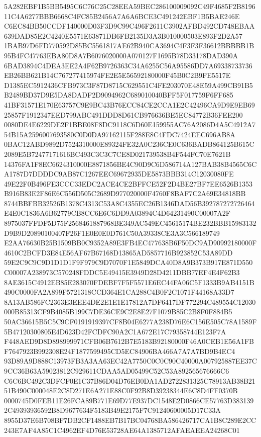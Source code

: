 \documentclass[UTF8,fontset=fandol,zihao=-4,a4paper]{ctexart}
\begin{document}
{{5A282EBF1B5BB5495C6C76C25C28EEA59BEC286100009092C49F4685F2B819611C4A6277BBB6668C4FC85B2456A7A6A6BCE3C491242EBF1B5BAE246E
C6EC84BB50CCDF140000D03F3D9C99C496F2611C3902AFBD492CD748EBAA639DAD85E2C4240E5571E63871DB6FB2135D3A3B010000503E893F2D2A57
1BAB97D6FD770592D85BC5561817AE62B940CA3694C4F3F3F36612BBBBB1B95B4FC47763EBA80D8A7B6076020000A070127F1695B78D33178DAD390A
6BAD3894C4DEA3EE2A4F62B9726363C34A6255C56A95586DD7A69338733736EB26BB621B14C767277415974FE2E5E56592180000F45B0C2B9FE5517E
D1385EC5912436CFB973C3F87D8715C629551C4FE203070E48E59A499CB91B5B2489BD37D9E5DA8DADF2D9094962C689010040BFF5F017759F6FF685
41BF31571E170E63757C9E9BC43B76ECC84CE2CCA1E2C42496CA9D9E9EB6925857F1912347EED799ABC491DDD8D61CB976636BE5EC84772B36FEE200
0080DE4E6229DE2F1BBE08F8DC9118C6D60E159955AC76A2086D4A5C4912A754B15A2596007693580C0D0DA97162115F288E8C4FDC7424EEC696AB8A
0BAC12ABD9892D7524310000E89324FE32A0C236CE0C636BADB864125B615C2089E5B72477171616BC493C3C3C7CE8D021739538B4F544FC70E7621B
14376FA1F8EC6624310000E8871856BE4C90D9C6D586714A127BAB38B4565C6CA1787D7DDDDC9AB87C1267EEC69672935DE5873BBB314C12030080FE
49E22F0B496FE3CCC33EDC2ACE4CE2BFFCE52F2D4BE27BF7EE6526B1353B916B83E2F86E6C556D505C2689D977020000F4760F8BAF7C2A69E34818BB
8744BBFBB32526B1378C4313C53A8C4355EC26B1346DAD56B392787272726464E4E0C1836A6B62779CB8CC6E6C6DD9A03894C4D64231490C00007A2F
8975037FFDF5D75F2568461887968BE349AC549EC45615174BE232BBB15983132D9B9D20890100407F26F1E0E0E0D761C50A39338CE3A3C566189749
E2AA76630B25B1509BB0C9352A89E3FB4EC477638B6F50DC9AD90992180000F4610C2BCFD3E84E56AF67B67168D13865AD5857716B923852C53A89DD
59E2C9C9C9D1D1D1F9F979C9D7070F1E5849DCA40D8A9B373B917E871D550C00007A238973C570248FDDC5E49415E3949D28D4211DBB77EF4E4F62B3
8AE3615C4912EB85E283070FDEBF7F5F5571E6EC44FA06C5F1333B9AB4151B490C0000FA2A899F5721318CCD364E1CA288C4B0F2C1071F44168A33D7
8A13AB586FC2363E3EEE4DE2E1E1E17812A7DF6417DF772294C489554C12030000B85313CF9B4085B199C7DE36CE9C2E8E27F1079B85C2B8F0F884B5
50AC36615B5C5C9CF0191919397CF8B04E6277A238D76E6C156E505C78A1589F5B47120300805E4D623D42FCDFC90A2C1A672E17C79358744E123F7A
F448AED9D8D898999971CFB06B7612B7E5183B92180000F46A0CEB1E56A1FBF7647923B992308E24F1877599495CD5EC84906BA466A7A7A7BD9B4EC4
93D89A9D888C13973FB3A3AA63EC42A7750C0C0C90C40000A007925887EE37C9CC36B63A59023812C929611CDAA5AD05499C52C53A892565676666C6
C6C6BC492C3DFCF0E1C37B86D04D76EB0DA1AD2722831325C78913AB38B2151B490C000048E2C8D271E6A271E88C0F92B8D39238344E6C8D4FF0370B
0000745D0FEB11E26FCA89B771E69D77E937DC1548E2D0866CE57763D3831392C49393936592B8D9677634F5183B49E2175F7C91240600005D17C33A
8955D37E6B708BF7DB2CF1488EB7B17BC04768BA586426717CA1B8C289E2CC243E7AF4A85C1C4962EF4D76E53728AE64A1385712AFAEAEEA24268C01
}}
\end{document}
